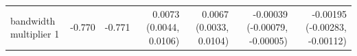 \begin{tabular}{lrrrrrr}
bandwidth multiplier 1 & -0.770 & -0.771 & 0.0073 (0.0044, 0.0106) & 0.0067 (0.0033, 0.0104) & -0.00039 (-0.00079, -0.00005) & -0.00195 (-0.00283, -0.00112) \\

\end{tabular}
